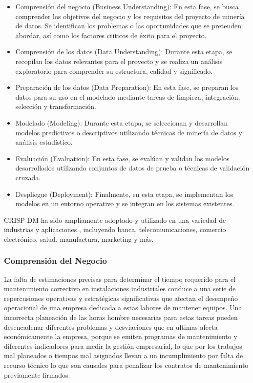 \documentclass[
  11pt,
  bookmarksnumbered]{article}
\begin{document}
\begin{itemize}
\item
  Comprensión del negocio (Business Understanding): En esta fase, se busca comprender los objetivos del negocio y los requisitos del proyecto de minería de datos.
  Se identifican los problemas o las oportunidades que se pretenden abordar, así como los factores críticos de éxito para el proyecto.
\item
  Comprensión de los datos (Data Understanding): Durante esta etapa, se recopilan los datos relevantes para el proyecto y se realiza un análisis exploratorio para comprender su estructura, calidad y significado.
\item
  Preparación de los datos (Data Preparation): En esta fase, se preparan los datos para su uso en el modelado mediante tareas de limpieza, integración, selección y transformación.
\item
  Modelado (Modeling): Durante esta etapa, se seleccionan y desarrollan modelos predictivos o descriptivos utilizando técnicas de minería de datos y análisis estadístico.
\item
  Evaluación (Evaluation): En esta fase, se evalúan y validan los modelos desarrollados utilizando conjuntos de datos de prueba o técnicas de validación cruzada.
\item
  Despliegue (Deployment): Finalmente, en esta etapa, se implementan los modelos en un entorno operativo y se integran en los sistemas existentes.
\end{itemize}

CRISP-DM ha sido ampliamente adoptado y utilizado en una variedad de industrias y aplicaciones \textcite{Pyle1999}, incluyendo banca, telecomunicaciones, comercio electrónico, salud, manufactura, marketing y más.

\hypertarget{comprensiuxf3n-del-negocio}{%
\subsubsection{Comprensión del Negocio}\label{comprensiuxf3n-del-negocio}}

La falta de estimaciones precisas para determinar el tiempo requerido para el mantenimiento correctivo en instalaciones industriales conduce a una serie de repercusiones operativas y estratégicas significativas que afectan el desempeño operacional de una empresa dedicada a estas labores de mantener equipos.
Una incorrecta planeación de las horas hombre necesarias para estas tareas pueden desencadenar diferentes problemas y desviaciones que en ultimas afecta económicamente la empresa, porque se emiten programas de mantenimiento y diferentes indicadores para medir la gestión empresarial, lo que por los trabajos mal planeados o tiempos mal asignados llevan a un incumplimiento por falta de recurso técnico lo que son causales para penalizar los contratos de mantenimiento previamente firmados.
\end{document}
